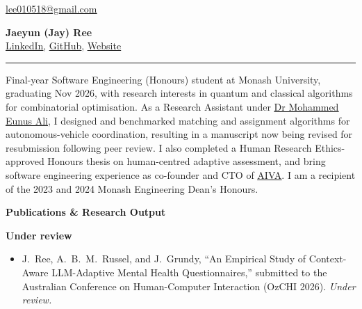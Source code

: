 \documentclass[11pt, a4paper]{article}
\let\hrefnoul\href
\renewcommand{\href}[2]{\hrefnoul{#1}{\ul{#2}}}
\newcommand{\resumesection}[1]{%
  \vspace{6pt}\par
  {\setlength{\fboxsep}{5pt}%
   \noindent\colorbox{sectionbg}{%
     \parbox{\dimexpr\linewidth-10pt\relax}{\strut\textbf{\large #1}\strut}%
   }}%
  \vspace{2pt}\par
}
\begin{document}

\noindent
\begin{minipage}[c]{0.25\textwidth}
  \href{mailto:lee010518@gmail.com}{lee010518@gmail.com}
\end{minipage}%
\begin{minipage}[c]{0.50\textwidth}
  \centering
  {\fontsize{26}{30}\selectfont\textbf{Jaeyun (Jay) Ree}}\\[3pt]
  \href{https://www.linkedin.com/in/jaeyun-ree-75b17b26b/}{LinkedIn},%
  \href{https://github.com/JayReeMarine/}{GitHub},%
  \href{https://jaeyunree.com/}{Website}%
\end{minipage}%
\begin{minipage}[c]{0.25\textwidth}
\end{minipage}

\vspace{4pt}
{\color{linkblue}\rule{\linewidth}{1.2pt}}
\vspace{2pt}

Final-year Software Engineering (Honours) student at Monash University, graduating Nov 2026, with research interests in quantum and classical algorithms for combinatorial optimisation. As a Research Assistant under \href{https://research.monash.edu/en/persons/eunus-ali}{Dr Mohammed Eunus Ali}, I designed and benchmarked matching and assignment algorithms for autonomous-vehicle coordination, resulting in a manuscript now being revised for resubmission following peer review. I also completed a Human Research Ethics-approved Honours thesis on human-centred adaptive assessment, and bring software engineering experience as co-founder and CTO of \href{https://github.com/AIVA-MVP}{AIVA}. I am a recipient of the 2023 and 2024 Monash Engineering Dean's Honours.

\resumesection{Publications \& Research Output}

\vspace{3pt}
\noindent\textbf{Under review}
\begin{itemize}[leftmargin=1.5em, itemsep=2pt, topsep=1pt, parsep=0pt]
  \item J.~Ree, A.~B.~M.~Russel, and J.~Grundy, ``An Empirical Study of Context-Aware LLM-Adaptive Mental Health
        Questionnaires,'' submitted to the Australian Conference on Human-Computer Interaction
        (OzCHI 2026). \textit{Under review.}
\end{itemize}
\end{document}
